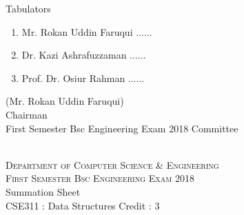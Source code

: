 \documentclass[12pt]{article}
\begin{document}
            \begin{table}[hb]
            	\centering
            \begin{minipage}[b]{0.5\linewidth} %
            {\centering Tabulators }
            \begin{enumerate}
                \item Mr. Rokan Uddin Faruqui \hspace*{1ex} $\ldots \ldots  $  
                \item Dr. Kazi Ashrafuzzaman \hspace*{1ex} $\ldots \ldots  $  
                \item Prof. Dr. Osiur Rahman \hspace*{1ex} $\ldots \ldots $  
            \end{enumerate} 

            \end{minipage}
            \hspace*{1.2cm}
            \begin{minipage}[b]{0.4\linewidth} \centering
            (Mr. Rokan Uddin Faruqui) \\
            Chairman  \hspace*{1ex} \\
           First Semester Bsc Engineering Exam 2018 Committee
            \end{minipage}
            \end{table}
            \clearpage
    \centering
    \begin{minipage}[m]{.8\textwidth} \centering 
	\smallskip
	\\
	\textsc{Department of Computer Science \& Engineering}\\
	\textsc{ First Semester Bsc Engineering Exam 2018}\\
    {\large {\sc Summation Sheet}}\\  
     {\centering CSE311 : Data Structures     Credit : 3 } \\
    \end{minipage} 
\end{document}
